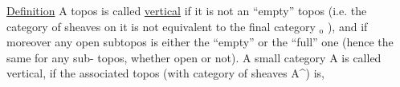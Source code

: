 \uline{Definition}   A topos is called \uline{vertical} if it is not an ``empty'' topos
(i.e. the category of sheaves on it is not equivalent to  the final
category \hand{$\Delta$}$_{\mathrm{o}}$ ),  and if moreover any  open subtopos
is either the ``empty'' or the ``full'' one (hence the same for any sub-%
topos,  whether open or not).  A  small category A is called
vertical,  if the associated topos (with category of sheaves A\^{}) is,

